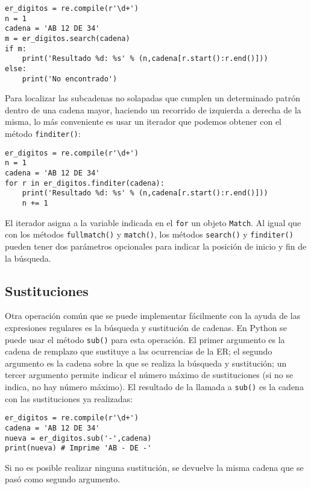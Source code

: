 \begin{lstlisting}
er_digitos = re.compile(r'\d+')
n = 1
cadena = 'AB 12 DE 34'
m = er_digitos.search(cadena)
if m:
	print('Resultado %d: %s' % (n,cadena[r.start():r.end()]))
else:
	print('No encontrado')
\end{lstlisting}

Para localizar las subcadenas no solapadas que cumplen un determinado patrón dentro de una cadena mayor, haciendo un recorrido de izquierda a derecha de la misma, lo más conveniente es usar un iterador que podemos obtener con el método \texttt{finditer()}:

\begin{lstlisting}
er_digitos = re.compile(r'\d+')
n = 1
cadena = 'AB 12 DE 34'
for r in er_digitos.finditer(cadena):
	print('Resultado %d: %s' % (n,cadena[r.start():r.end()]))
	n += 1
\end{lstlisting}

El iterador asigna a la variable indicada en el \texttt{for} un objeto \texttt{Match}. Al igual que con los métodos \texttt{fullmatch()} y \texttt{match()}, los métodos \texttt{search()} y \texttt{finditer()} pueden tener dos parámetros opcionales para indicar la posición de inicio y fin de la búsqueda.

\subsection{Sustituciones}

Otra operación común que se puede implementar fácilmente con la ayuda de las expresiones regulares es la búsqueda y sustitución de cadenas. En Python se puede usar el método \texttt{sub()} para esta operación. El primer argumento es la cadena de remplazo que sustituye a las ocurrencias de la ER; el segundo argumento es la cadena sobre la que se realiza la búsqueda y sustitución; un tercer argumento permite indicar el número máximo de sustituciones (si no se indica, no hay número máximo). El resultado de la llamada a \texttt{sub()} es la cadena con las sustituciones ya realizadas:

\begin{lstlisting}
er_digitos = re.compile(r'\d+')
cadena = 'AB 12 DE 34'
nueva = er_digitos.sub('-',cadena)
print(nueva) # Imprime 'AB - DE -'
\end{lstlisting}

Si no es posible realizar ninguna sustitución, se devuelve la misma cadena que se pasó como segundo argumento.

